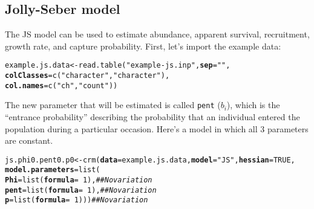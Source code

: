 \documentclass[12pt]{article}\usepackage[]{graphicx}\usepackage[]{xcolor}
\makeatletter
\newcommand{\hlnum}[1]{\textcolor[rgb]{0.69,0.494,0}{#1}}%
\newcommand{\hlsng}[1]{\textcolor[rgb]{0.749,0.012,0.012}{#1}}%
\newcommand{\hlcom}[1]{\textcolor[rgb]{0.514,0.506,0.514}{\textit{#1}}}%
\newcommand{\hlopt}[1]{\textcolor[rgb]{0,0,0}{#1}}%
\newcommand{\hldef}[1]{\textcolor[rgb]{0,0,0}{#1}}%
\newcommand{\hlkwb}[1]{\textcolor[rgb]{0,0.341,0.682}{#1}}%
\newcommand{\hlkwc}[1]{\textcolor[rgb]{0,0,0}{\textbf{#1}}}%
\newcommand{\hlkwd}[1]{\textcolor[rgb]{0.004,0.004,0.506}{#1}}%
\newenvironment{kframe}{%
 \def\at@end@of@kframe{}%
 \ifinner\ifhmode%
  \def\at@end@of@kframe{\end{minipage}}%
  \begin{minipage}{\columnwidth}%
 \fi\fi%
 \def\FrameCommand##1{\hskip\@totalleftmargin \hskip-\fboxsep
 \colorbox{shadecolor}{##1}\hskip-\fboxsep
     \hskip-\linewidth \hskip-\@totalleftmargin \hskip\columnwidth}%
 \MakeFramed {\advance\hsize-\width
   \@totalleftmargin\z@ \linewidth\hsize
   \@setminipage}}%
 {\par\unskip\endMakeFramed%
 \at@end@of@kframe}
\newenvironment{knitrout}{}{} %
\makeatother
\begin{document}
\clearpage

\subsection*{Jolly-Seber model}

The JS model can be used to estimate abundance, apparent survival,
recruitment, growth rate, and capture probability. First, let's import
the example data: 

\begin{knitrout}
\color{fgcolor}\begin{kframe}
\begin{alltt}
\hldef{example.js.data} \hlkwb{<-} \hlkwd{read.table}\hldef{(}\hlsng{"example-js.inp"}\hldef{,} \hlkwc{sep}\hldef{=}\hlsng{" "}\hldef{,}
                              \hlkwc{colClasses}\hldef{=}\hlkwd{c}\hldef{(}\hlsng{"character"}\hldef{,}\hlsng{"character"}\hldef{),}
                              \hlkwc{col.names}\hldef{=}\hlkwd{c}\hldef{(}\hlsng{"ch"}\hldef{,} \hlsng{"count"}\hldef{))}
\end{alltt}
\end{kframe}
\end{knitrout}

The new parameter that will be estimated is called \texttt{pent} ($b_i$),
which is the ``entrance probability'' describing the probability that
an individual entered the population during a particular
occasion. Here's a model in which all 3 parameters are constant.


\begin{knitrout}
\color{fgcolor}\begin{kframe}
\begin{alltt}
\hldef{js.phi0.pent0.p0} \hlkwb{<-} \hlkwd{crm}\hldef{(}\hlkwc{data}\hldef{=example.js.data,} \hlkwc{model}\hldef{=}\hlsng{"JS"}\hldef{,} \hlkwc{hessian}\hldef{=}\hlnum{TRUE}\hldef{,}
                        \hlkwc{model.parameters}\hldef{=}\hlkwd{list}\hldef{(}
                            \hlkwc{Phi}\hldef{=}\hlkwd{list}\hldef{(}\hlkwc{formula}\hldef{=}\hlopt{~}\hlnum{1}\hldef{),}   \hlcom{## No variation}
                            \hlkwc{pent}\hldef{=}\hlkwd{list}\hldef{(}\hlkwc{formula}\hldef{=}\hlopt{~}\hlnum{1}\hldef{),}  \hlcom{## No variation}
                            \hlkwc{p}\hldef{=}\hlkwd{list}\hldef{(}\hlkwc{formula}\hldef{=}\hlopt{~}\hlnum{1}\hldef{)))}    \hlcom{## No variation}
\end{alltt}
\end{kframe}
\end{knitrout}
\end{document}
